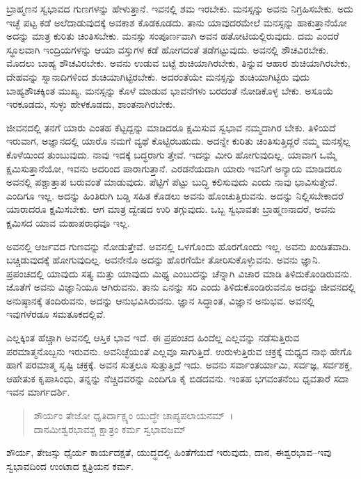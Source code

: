 ಬ್ರಾಹ್ಮಣನ ಸ್ವಭಾವದ ಗುಣಗಳನ್ನು ಹೇಳುತ್ತಾನೆ. ಇವನಲ್ಲಿ ಶಮ ಇರಬೇಕು. ಮನಸ್ಸನ್ನು ಅವನು ನಿಗ್ರಹಿಸಬೇಕು. ಅದು ಇಚ್ಛೆ ಪಟ್ಟ ಕಡೆ ಅಲೆದಾಡುವುದಕ್ಕೆ ಅವಕಾಶ ಕೊಡಕೂಡದು. ತಾನು ಯಾವುದರಮೇಲೆ ಮನಸ್ಸನ್ನು ಹಾಕುತ್ತಾನೆಯೋ ಅದನ್ನು ಮಾತ್ರ ಕುರಿತು ಚಿಂತಿಸಬೇಕು. ಮನಸ್ಸು ಸಂಪೂರ್ಣವಾಗಿ ಅವನ ಹತೋಟಿಯಲ್ಲಿರುವುದು. ದಮ ಎಂದರೆ ಸ್ಥೂಲವಾಗಿ ಇಂದ್ರಿಯಗಳನ್ನು ಆಯಾ ವಸ್ತುಗಳ ಕಡೆ ಹೋಗದಂತೆ ತಡೆಗಟ್ಟುವುದು. ಅವನಲ್ಲಿ ಶೌಚವಿರಬೇಕು. ಮೊದಲು ಬಾಹ್ಯ ಶೌಚವಿರಬೇಕು. ಅವನು ಉಡುವ ಬಟ್ಟೆ ಶುಚಿಯಾಗಿರಬೇಕು, ತಿನ್ನುವ ಆಹಾರ ಶುಚಿಯಾಗಿರಬೇಕು, ದೇಹವನ್ನು ಸ್ನಾನಾದಿಗಳಿಂದ ಶುಚಿಯಾಗಿಟ್ಟಿರಬೇಕು. ಅದರಂತೆಯೇ ಮನಸ್ಸನ್ನು ಶುಚಿಯಾಗಿಟ್ಟಿರು ವುದು ಬಾಹ್ಯಶೌಚಕ್ಕಿಂತ ಮುಖ್ಯ. ಮನಸ್ಸನ್ನು ಕೊಳೆ ಮಾಡುವ ಭಾವನೆಗಳು ಬರದಂತೆ ನೋಡಿಕೊಳ್ಳ ಬೇಕು. ಅಸೂಯೆ ಇರಕೂಡದು, ಸುಳ್ಳು ಹೇಳಕೂಡದು, ಶಾಂತನಾಗಿರಬೇಕು.

ಜೀವನದಲ್ಲಿ ತನಗೆ ಯಾರು ಎಂತಹ ಕೆಟ್ಟದ್ದನ್ನು ಮಾಡಿದರೂ ಕ್ಷಮಿಸುವ ಸ್ವಭಾವ ನಮ್ಮದಾಗಿರ ಬೇಕು. ತಿಳಿಯದೆ ಇರುವಾಗ, ಅಜ್ಞಾನದಲ್ಲಿ ಯಾರೊ ನಮಗೆ ವ್ಯಥೆ ಕೊಟ್ಟಿರಬಹುದು. ಅದನ್ನೇ ಕುರಿತು ಚಿಂತಿಸುತ್ತಿದ್ದರೆ ನಮ್ಮ ಮನಸ್ಸೆಲ್ಲ ಕೊಳೆಯಿಂದ ತುಂಬುವುದು. ನಾವು ಇದಕ್ಕೆ ಬದ್ಧರಾಗು ತ್ತೇವೆ. ಇದನ್ನು ಮೀರಿ ಹೋಗುವುದಿಲ್ಲ. ಯಾವಾಗ ಒಮ್ಮೆ ಕ್ಷಮಿಸುತ್ತಾನೆಯೋ, ಇವನು ಅದರಿಂದ ಪಾರಾಗುತ್ತಾನೆ. ಎರಡನೆಯದಾಗಿ ಯಾರು ಇವನಿಗೆ ಅನ್ಯಾಯ ಮಾಡಿದರೂ ಅವನಲ್ಲಿ ಪಶ್ಚಾತ್ತಾಪ ಬರುವಂತೆ ಮಾಡುವುದು. ಪೆಟ್ಟಿಗೆ ಪೆಟ್ಟು ಬುದ್ಧಿ ಕಲಿಸುವುದು ಎಂದು ನಾವು ಭಾವಿಸುತ್ತೇವೆ. ಎಂದಿಗೂ ಇಲ್ಲ. ಅದನ್ನು ಹಿಂತಿರುಗಿ ಬಡ್ಡಿ ಸಹಿತ ಕೊಡಲು ಅವನು ಹೊಂಚುತ್ತಿರುವನು. ಅದನ್ನು ನಿಲ್ಲಿಸಬೇಕಾದರೆ ಯಾರಾದರೂ ಕ್ಷಮಿಸಬೇಕು. ಆಗ ಮಾತ್ರ ದ್ವೇಷದ ಉರಿ ತಗ್ಗುವುದು. ಒಬ್ಬ ಸ್ವಭಾವತಃ ಬ್ರಾಹ್ಮಣನಾದರೆ, ಅವನು ಕ್ಷಮಿಸದ ಯಾವ ಮಹಾಪರಾಧವೂ ಇಲ್ಲ.

ಅವನಲ್ಲಿ ಆರ್ಜವದ ಗುಣವನ್ನು ನೋಡುತ್ತೇವೆ. ಅವನಲ್ಲಿ ಒಳಗೊಂದು ಹೊರಗೊಂದು ಇಲ್ಲ. ಅವನು ಖಂಡಿತವಾದಿ. ಬಚ್ಚಿಡುವುದಕ್ಕೆ ಹೋಗುವುದಿಲ್ಲ. ಅವನೇನೊ ಅದನ್ನು ಹೊರಗೆಯೇ ತೋರಿಸುಕೊಳ್ಳುವನು. ಅವನು ಜ್ಞಾನಿ. ಪ್ರಪಂಚದಲ್ಲಿ ಯಾವುದು ಸತ್ಯ ಮತ್ತು ಯಾವುದು ಮಿಥ್ಯ ಎಂಬುದನ್ನು ಚೆನ್ನಾಗಿ ವಿಚಾರ ಮಾಡಿ ತಿಳಿದುಕೊಂಡಿರುವನು. ಜೊತೆಗೆ ಅವನು ವಿಜ್ಞಾನಿಯೂ ಆಗಿರುವನು. ತಾನು ಏನನ್ನು ಸರಿ ಎಂದು ತಿಳಿದುಕೊಂಡಿರುವನೊ ಅದನ್ನು ಜೀವನದಲ್ಲಿ ಅನುಷ್ಠಾನಕ್ಕೆ ತಂದಿರುವನು, ಅದನ್ನು ಆನುಭವಿಸಿರುವನು. ಜ್ಞಾನ ಸಿದ್ಧಾಂತ, ವಿಜ್ಞಾನ ಅನುಭವ. ಅವನಲ್ಲಿ ಇವುಗಳೆರಡೂ ಸಮತೂಕದಲ್ಲಿವೆ.

ಎಲ್ಲಕ್ಕಿಂತ ಹೆಚ್ಚಾಗಿ ಅವನಲ್ಲಿ ಆಸ್ತಿಕ ಭಾವ ಇದೆ. ಈ ಪ್ರಪಂಚದ ಹಿಂದೆಲ್ಲ ಎಲ್ಲವನ್ನು ನಡೆಸುತ್ತಿರುವ ಪರಮಾತ್ಮನೊಬ್ಬನು ಇರುವನು. ಅವನಿಚ್ಛೆಯಂತೆ ಎಲ್ಲವೂ ಸಾಗುತ್ತಿದೆ. ಉರುಳುತ್ತಿರುವ ಚಕ್ರಕ್ಕೆ ಮಧ್ಯದ ನಾಭಿ ಹೇಗೊ ಹಾಗೆ ಪರಮಾತ್ಮ ಸೃಷ್ಟಿ ಚಕ್ರಕ್ಕೆ. ಅವನ ಸುತ್ತಲೂ ಸುತ್ತುತ್ತಿದೆ ಇದು. ಅವನು ಸರ್ವಾಂತರ್ಯಾಮಿ, ಸರ್ವಜ್ಞ, ಸರ್ವಶಕ್ತ, ಆಹೇತುಕ ಕೃಪಾಸಿಂಧು, ತನ್ನನ್ನು ನೆಚ್ಚಿದವರನ್ನು ಎಂದಿಗೂ ಕೈ ಬಿಡದವನು. ಇಂತಹ ಭಗವಂತನೆಂಬ ಧೃವತಾರೆ ಸದಾ ಇವನ ಮಾರ್ಗದರ್ಶಿ.

\begin{verse}
ಶೌರ್ಯಂ ತೇಜೋ ಧೃತಿರ್ದಾಕ್ಷ್ಯಂ ಯುದ್ಧೇ ಚಾಪ್ಯಪಲಾಯನಮ್~।\\ದಾನಮೀಶ್ವರಭಾವಶ್ಚ ಕ್ಷಾತ್ರಂ ಕರ್ಮ ಸ್ವಭಾವಜಮ್ 
\end{verse}

{\small ಶೌರ್ಯ, ತೇಜಸ್ಸು ಧೈರ್ಯ ಕಾರ್ಯದಕ್ಷತೆ, ಯುದ್ಧದಲ್ಲಿ ಹಿಂತೆಗೆಯದೆ ಇರುವುದು, ದಾನ, ಈಶ್ವರಭಾವ–ಇವು ಸ್ವಭಾವದಿಂದ ಉಂಟಾದ ಕ್ಷತ್ರಿಯನ ಕರ್ಮ.}

